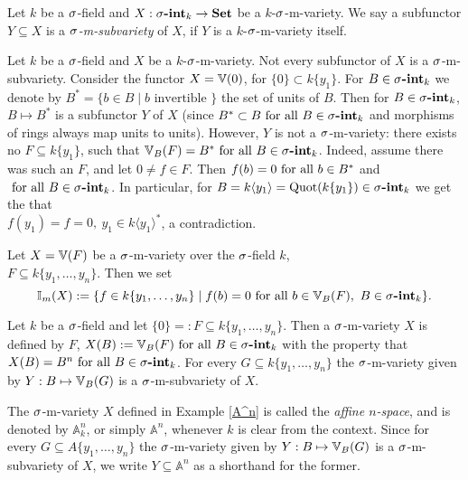 \begin{defn}
Let $k$ be a $\sigma$-field and $X: \sigma\text{{\normalfont\textbf{-int}}}_k \rightarrow {\normalfont\textbf{Set}}$ be a $k$-$\sigma$-m-variety. We say a subfunctor $Y \subseteq X$ is a \emph{$\sigma$-m-subvariety} of $X$, if $Y$ is a $k$-$\sigma$-m-variety itself. 
\end{defn}

 \begin{rem}
Let $k$ be a $\sigma$-field and $X$ be a $k$-$\sigma$-m-variety. Not every subfunctor of $X$ is a $\sigma$-m-subvariety. Consider the functor $X = \mathbb{V}(0)$, for $\{0\} \subset k\{y_1\}$.
For $B \in \sigma\text{{\normalfont\textbf{-int}}}_k$ we denote by $B^* = \{ b \in B \mid b \text{ invertible } \}$ the set of units of $B$. Then for $B \in \sigma\text{{\normalfont\textbf{-int}}}_k$, $B \mapsto B^*$ is a subfunctor $Y$ of $X$ (since $B^* \subset B \text{ for all } B \in \sigma\text{{\normalfont\textbf{-int}}}_k$ and morphisms of rings always map units to units). However, $Y$ is not a $\sigma$-m-variety:
there exists no $F \subseteq k\{y_1\}$, such that $\mathbb{V}_B(F) = B^* \text{ for all } B \in \sigma\text{{\normalfont\textbf{-int}}}_k$.  Indeed, assume there was such an $F$, and let $0 \neq f \in F$. Then $f(b) = 0 \text{ for all } b \in B^*$ and $\text{ for all } B \in \sigma\text{{\normalfont\textbf{-int}}}_k$. In particular,
for $B = k\langle y_1 \rangle = \operatorname{Quot}(k\{y_1\}) \in \sigma\text{{\normalfont\textbf{-int}}}_k$ we get the that \\$f(y_1) = f = 0, ~ y_1 \in k \langle y_1 \rangle^*$, a contradiction.  
\end{rem}

\begin{defn}\label{defnI}
Let $X = \mathbb{V}(F)$ be a $\sigma$-m-variety over the $\sigma$-field $k$, \\$F \subseteq k\{y_1,\ldots,y_n\}$. Then we set $$\mathbb{I}_m(X):= \{ f \in k\{y_1,\ldots,y_n\} \mid f(b) = 0 \text{ for all } b \in \mathbb{V}_B(F), ~ B \in \sigma\text{{\normalfont\textbf{-int}}}_k \}.$$ 
\end{defn}

\begin{ex}\label{A^n}
Let $k$ be a $\sigma$-field and let $\{ 0 \} =: F \subseteq k\{y_1,\ldots,y_n\}$. Then a $\sigma$-m-variety $X$ is defined by $F$, $X(B) := \mathbb{V}_B(F) \text{ for all } B \in \sigma\text{{\normalfont\textbf{-int}}}_k$ with the property that $X(B) = B^n \text{ for all } B \in \sigma\text{{\normalfont\textbf{-int}}}_k$.
For every $G \subseteq k\{y_1,\ldots,y_n\}$ the $\sigma$-m-variety given by $Y: B \mapsto \mathbb{V}_B(G)$ is a $\sigma$-m-subvariety of $X$. 
\end{ex}

\begin{defn}\label{defA^n}
The $\sigma$-m-variety $X$ defined in Example \ref{A^n} is called the \emph{affine $n$-space}, and is denoted by $\mathbb{A}^n_k$, 
or simply $\mathbb{A}^n$, whenever $k$ is clear from the context.   
Since for every $G \subseteq A\{y_1,\ldots,y_n\}$ the $\sigma$-m-variety given by $Y: B \mapsto \mathbb{V}_B(G)$ is a $\sigma$-m-subvariety of $X$, 
we write $Y \subseteq \mathbb{A}^n$ as a shorthand for the former.
\end{defn}


